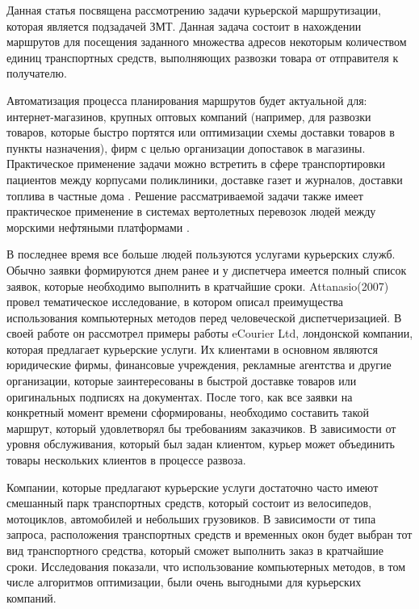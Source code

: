 \documentclass[]{TAACpaper}
\begin{document}
Данная статья посвящена рассмотрению задачи курьерской маршрутизации, которая является подзадачей ЗМТ. Данная задача состоит в нахождении маршрутов для посещения заданного множества адресов некоторым количеством единиц транспортных средств, выполняющих развозки товара от отправителя к получателю. 

Автоматизация процесса планирования маршрутов будет актуальной для:  интернет-магазинов, крупных оптовых компаний (например, для развозки товаров, которые быстро портятся или оптимизации схемы доставки товаров в пункты назначения), фирм с целью организации допоставок в магазины. Практическое применение задачи можно встретить в сфере транспортировки пациентов между корпусами поликлиники\cite{Beaudry, Kergosien}, доставке газет и журналов, доставки топлива в частные дома \cite{Sarak}. Решение рассматриваемой задачи также имеет практическое применение в системах вертолетных перевозок людей между морскими нефтяными платформами \cite{Romero}.

В последнее время все больше людей пользуются услугами курьерских служб.  Обычно заявки формируются днем ранее и у диспетчера имеется полный список заявок, которые необходимо выполнить в кратчайшие сроки. Attanasio(2007) \cite{Attanasio} провел тематическое исследование, в котором описал преимущества использования компьютерных методов перед человеческой диспетчеризацией. В своей работе он рассмотрел примеры работы eCourier Ltd, лондонской компании, которая предлагает курьерские услуги. Их клиентами в основном являются юридические фирмы, финансовые учреждения, рекламные агентства и другие организации, которые заинтересованы в быстрой доставке товаров или оригинальных подписях на документах. После того, как все заявки на конкретный момент времени сформированы, необходимо составить такой маршрут, который удовлетворял бы требованиям заказчиков. В зависимости от уровня обслуживания, который был задан клиентом, курьер может объединить товары нескольких клиентов в процессе развоза. 

Компании, которые предлагают курьерские услуги достаточно часто имеют смешанный парк транспортных средств, который состоит из велосипедов, мотоциклов, автомобилей и небольших грузовиков. В зависимости от типа запроса, расположения транспортных средств и временных окон будет выбран тот вид транспортного средства, который сможет выполнить заказ в кратчайшие сроки. Исследования \cite{Attanasio} показали, что использование компьютерных методов, в том числе алгоритмов оптимизации, были очень выгодными для курьерских компаний.
\end{document}
